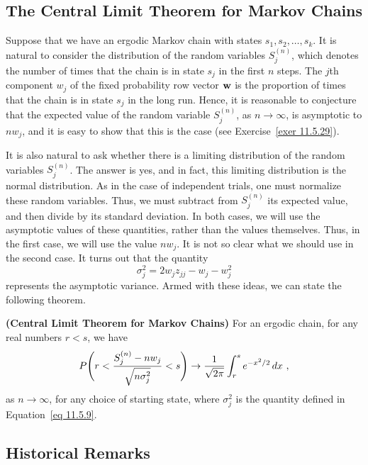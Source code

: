 \subsection*{The Central Limit Theorem for Markov Chains}
Suppose that we have an ergodic Markov chain with states $s_1, s_2, \ldots,
s_k$.
It is natural to consider the distribution of the random variables $S^{(n)}_j$,
which
denotes the number of times that the chain is in state $s_j$ in the first $n$
steps.
The $j$th component $w_j$ of the fixed probability row vector ${\mbox{\bf w}\/}$ is the
proportion of
times that the chain is in state $s_j$ in the long run.  Hence, it is
reasonable to conjecture
that the expected value of the random variable $S^{(n)}_j$, as $n \rightarrow
\infty$, is
asymptotic to $nw_j$, and it is easy to show that this is the case (see
Exercise~\ref{exer
11.5.29}).
\par
It is also natural to ask whether there is a limiting distribution of the
random variables
$S^{(n)}_j$.  The answer is yes, and in fact, this limiting distribution is the
normal
distribution.  As in the case of independent trials, one must normalize these
random
variables.  Thus, we must subtract from $S^{(n)}_j$ its expected value, and
then 
divide by its standard deviation.  In both cases, we will use the asymptotic
values of these
quantities, rather than the values themselves.  Thus, in the first case, we
will use the
value $nw_j$.  It is not so clear what we should use in the second case.  It
turns out that
the quantity 
\begin{equation}
\sigma_j^2 = 2w_jz_{jj} - w_j - w_j^2
\label{eq 11.5.9}
\end{equation}
represents the asymptotic variance.  Armed with these ideas, we can state the
following
theorem.
\begin{theorem}\label{thm 11.5.20}{\bf (Central Limit Theorem for Markov
Chains)}
For an ergodic chain, for any real numbers $r < s$, we have
$$P\Biggl(r < {{S^{(n)}_j - nw_j}\over{\sqrt{n\sigma_j^2}}}< s\Biggr)
\rightarrow 
{1\over{\sqrt {2\pi}}}\int_r^s e^{-x^2/2}\,dx\
,$$ as $n \rightarrow \infty$, for any choice of starting state, where
$\sigma_j^2$ is
the quantity defined in Equation~\ref{eq 11.5.9}.
\end{theorem}


\subsection*{Historical Remarks}

